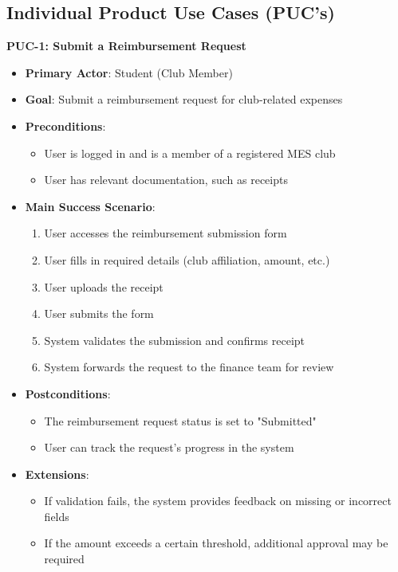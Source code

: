 \documentclass[12pt]{article}
\begin{document}
\subsection{Individual Product Use Cases (PUC's)}
\textbf{PUC-1: Submit a Reimbursement Request}
\begin{itemize}
    \item \textbf{Primary Actor}: Student (Club Member)
    \item \textbf{Goal}: Submit a reimbursement request for club-related expenses
    \item \textbf{Preconditions}:
    \begin{itemize}
        \item User is logged in and is a member of a registered MES club
        \item User has relevant documentation, such as receipts
    \end{itemize}
    \item \textbf{Main Success Scenario}:
    \begin{enumerate}
        \item User accesses the reimbursement submission form
        \item User fills in required details (club affiliation, amount, etc.)
        \item User uploads the receipt
        \item User submits the form
        \item System validates the submission and confirms receipt
        \item System forwards the request to the finance team for review
    \end{enumerate}
    \item \textbf{Postconditions}:
    \begin{itemize}
        \item The reimbursement request status is set to "Submitted"
        \item User can track the request's progress in the system
    \end{itemize}
    \item \textbf{Extensions}:
    \begin{itemize}
        \item If validation fails, the system provides feedback on missing or incorrect fields
        \item If the amount exceeds a certain threshold, additional approval may be required
    \end{itemize}
\end{itemize}
\end{document}
